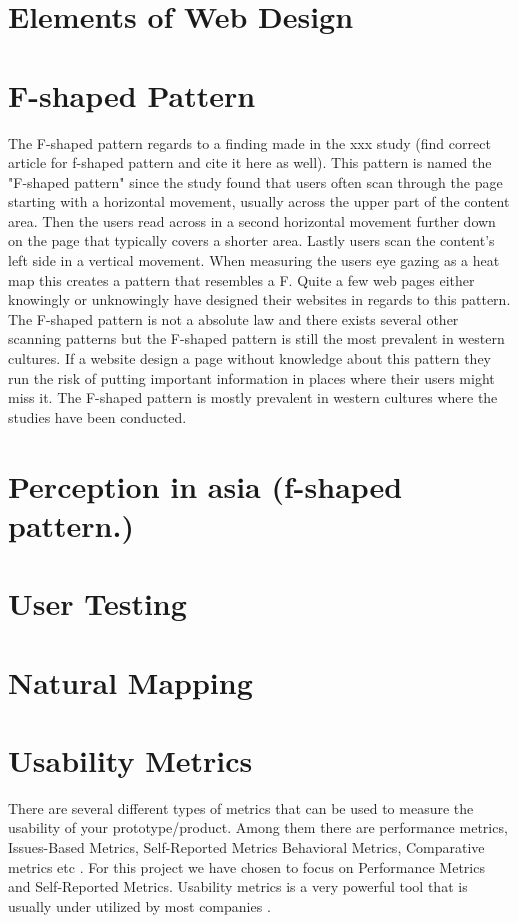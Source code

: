 \section{Elements of Web Design}
\section{F-shaped Pattern}
The F-shaped pattern regards to a finding made in the xxx study \cite{pernice2014people} (find correct article for f-shaped pattern and cite it here as well). This pattern is named the "F-shaped pattern" since the study found that users often scan through the page starting with a horizontal movement, usually across the upper part of the content area. Then the users read across in a second horizontal movement further down on the page that typically covers a shorter area. Lastly users scan the content’s left side in a vertical movement. When measuring the users eye gazing as a heat map this creates a pattern that resembles a F. Quite a few web pages either knowingly or unknowingly have designed their websites in regards to this pattern. The F-shaped pattern is not a absolute law and there exists several other scanning patterns but the F-shaped pattern is still the most prevalent in western cultures. \cite{f-shape_today} If a website design a page without knowledge about this pattern they run the risk of putting important information in places where their users might miss it. The F-shaped pattern is mostly prevalent in western cultures where the studies have been conducted.

\section{Perception in asia (f-shaped pattern.)}

\section{User Testing}
\section{Natural Mapping}
\section{Usability Metrics}
There are several different types of metrics that can be used to measure the usability of your prototype/product. Among them there are performance metrics, Issues-Based Metrics, Self-Reported Metrics Behavioral Metrics, Comparative metrics etc \cite{tullis_albert_2011}. For this project we have chosen to focus on Performance Metrics and Self-Reported Metrics. Usability metrics is a very powerful tool that is usually under utilized by most companies \cite{norman_metrics}. 
